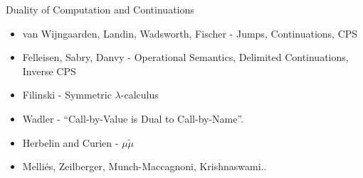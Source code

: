 \documentclass[svgnames,11pt]{beamer}
\newcommand{\lcal}{\ensuremath{\lambda}-calculus\xspace}
\begin{document}
\begin{frame}
  
    \begin{center}
    \end{center}

\end{frame}

\begin{frame}{ Duality of Computation and Continuations }
  
  \begin{itemize}
    \vfill
  \item van Wijngaarden, Landin, Wadsworth, Fischer - Jumps,
    Continuations, CPS
    
    \vfill
  \item Felleisen, Sabry, Danvy - Operational Semantics, Delimited
    Continuations, Inverse CPS
    
    \vfill
  \item Filinski - Symmetric \lcal
    \vfill
  \item Wadler - ``Call-by-Value is Dual to Call-by-Name''. 
    \vfill
  \item Herbelin and Curien - $\mu\tilde{\mu}$
    \vfill
  \item Melli\'{e}s, Zeilberger, Munch-Maccagnoni, Krishnaswami.. 
    \vfill
  \end{itemize}

\end{frame}
\end{document}
